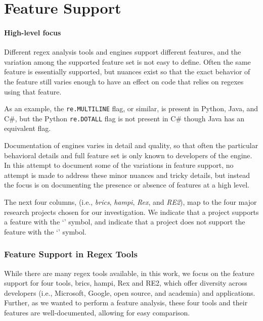 \section{Feature Support}

\paragraph{High-level focus} Different regex analysis tools and engines support different features, and the variation among the supported feature set is not easy to define.  Often the same feature is essentially supported, but nuances exist so that the exact behavior of the feature still varies enough to have an effect on code that relies on regexes using that feature.

As an example, the {\tt re.MULTILINE} flag, or similar, is present in Python, Java, and C\#, but  the Python {\tt re.DOTALL} flag is not present in C\# though Java has an equivalent flag.

Documentation of engines varies in detail and quality, so that often the particular behavioral details and full feature set is only known to developers of the engine.  In this attempt to document some of the variations in feature support, no attempt is made to address these minor nuances and tricky details, but instead the focus is on documenting the presence or absence of features at a high level.

The next four columns, (i.e., \emph{brics}, \emph{hampi}, \emph{Rex}, and \emph{RE2}), map to the four major research projects chosen for our investigation.  We indicate that a project supports a feature with the `\yes' symbol, and indicate that a project does not support the feature with the `\no' symbol.

\subsubsection{Feature Support in Regex Tools}
While there are many regex tools available, in this work, we focus on the feature support for  four tools, brics, hampi, Rex and RE2, which offer diversity across developers (i.e., Microsoft, Google, open source, and academia) and applications. Further, as we wanted to perform a feature analysis, these four tools and their features are well-documented, allowing for easy comparison.

